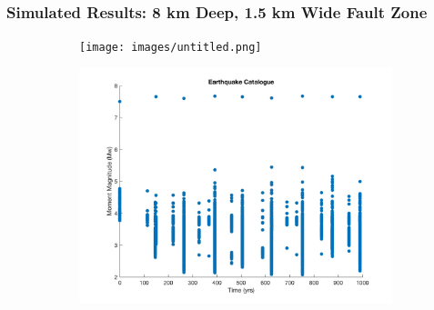 \documentclass{beamer}
\begin{document}
\begin{frame}
    \frametitle{Simulated Results: 8 km Deep, 1.5 km Wide Fault Zone}
    \begin{figure}
        \begin{subfigure}[b]{0.5\textwidth}
            \texttt{[image: images/untitled.png]} 
        \end{subfigure}%
        \begin{subfigure}[b]{0.5\textwidth}
            \includegraphics[width=\textwidth]{images/catalogue.jpg}
        \end{subfigure}%
    \end{figure}
\end{frame}
\end{document}
